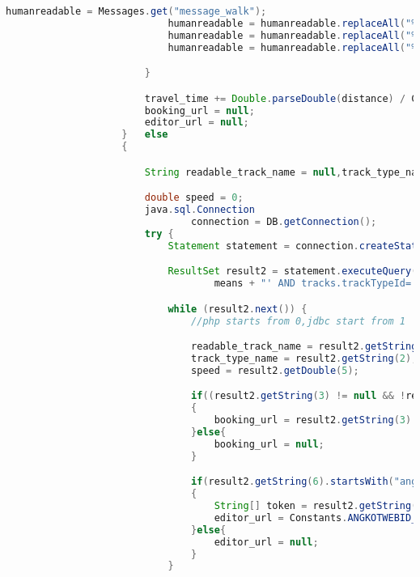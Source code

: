 \begin{lstlisting}[language=Java,basicstyle=\tiny,caption=Application.java]
                            humanreadable = Messages.get("message_walk");
                            humanreadable = humanreadable.replaceAll("%from",humanized_from);
                            humanreadable = humanreadable.replaceAll("%to",humanized_to);
                            humanreadable = humanreadable.replaceAll("%distance",format_distance(Double.parseDouble(distance),locale));

                        }

                        travel_time += Double.parseDouble(distance) / Constants.SPEED_WALK;
                        booking_url = null;
                        editor_url = null;
                    }   else
                    {

                        String readable_track_name = null,track_type_name = null;

                        double speed = 0;
                        java.sql.Connection
                                connection = DB.getConnection();
                        try {
                            Statement statement = connection.createStatement();

                            ResultSet result2 = statement.executeQuery("SELECT tracks.trackname, tracktypes.name, tracktypes.url, tracks.extraParameters, tracktypes.speed, tracks.internalInfo FROM tracks JOIN tracktypes ON tracktypes.trackTypeId='" +
                                    means + "' AND tracks.trackTypeId='" + means + "' AND tracks.trackid='"+ means_detail + "';");

                            while (result2.next()) {
                                //php starts from 0,jdbc start from 1

                                readable_track_name = result2.getString(1);
                                track_type_name = result2.getString(2);
                                speed = result2.getDouble(5);

                                if((result2.getString(3) != null && !result2.getString(3).isEmpty()) && (result2.getString(4) != null && !result2.getString(4).isEmpty()))
                                {
                                    booking_url = result2.getString(3) + result2.getString(4);
                                }else{
                                    booking_url = null;
                                }

                                if(result2.getString(6).startsWith("angkotwebid:"))
                                {
                                    String[] token = result2.getString(6).split(":");
                                    editor_url = Constants.ANGKOTWEBID_URL_PREFIX + token[1] + Constants.ANGKOTWEBID_URL_SUFFIX;
                                }else{
                                    editor_url = null;
                                }
                            }



\end{lstlisting}
